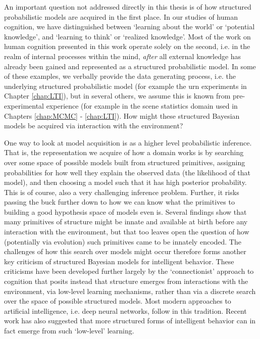 An important question not addressed directly in this thesis is of how structured probabilistic models are acquired in the first place. In our studies of human cognition, we have distinguished between `learning about the world' or `potential knowledge', and `learning to think' or `realized knowledge'. Most of the work on human cognition presented in this work operate solely on the second, i.e. in the realm of internal processes within the mind, \textit{after} all external knowledge has already been gained and represented as a structured probabilistic model. In some of these examples, we verbally provide the data generating process, i.e. the underlying structured probabilistic model (for example the urn experiments in Chapter \ref{chap:LTI}), but in several others, we assume this is known from pre-experimental experience (for example in the scene statistics domain used in Chapters \ref{chap:MCMC} - \ref{chap:LTI}). How might these structured Bayesian models be acquired via interaction with the environment?

One way to look at model acquisition is as a higher level probabilistic inference. That is, the representation we acquire of how a domain works is by searching over some space of possible models built from structured primitives, assigning probabilities for how well they explain the observed data (the likelihood of that model), and then choosing a model such that it has high posterior probability. This is of course, also a very challenging inference problem\citep{schulz2012finding, bramley2018grounding}. Further, it risks passing the buck further down to how we can know what the primitives to building a good hypothesis space of models even is. Several findings show that many primitives of structure might be innate and available at birth before any interaction with the environment\citep{spelke1998nativism, chomsky1967recent}, but that too leaves open the question of how (potentially via evolution) such primitives came to be innately encoded. The challenges of how this search over models might occur therefore forms another key criticism of structured Bayesian models for intelligent behavior. These criticisms have been developed further largely by the `connectionist' approach to cognition\cite{rogers2004semantic, mcclelland2010letting} that posits instead that structure emerges from interactions with the environment, via low-level learning mechanisms, rather than via a discrete search over the space of possible structured models. Most modern approaches to artificial intelligence, i.e. deep neural networks, follow in this tradition. Recent work has also suggested that more structured forms of intelligent behavior can in fact emerge from such `low-level' learning\citep{dasgupta2019causal, wang2018, botvinick2019reinforcement}.

